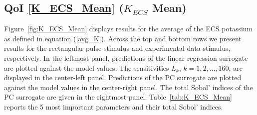 

\subsection{QoI \eqref{K_ECS_Mean} ($K_{ECS}$ Mean)}
\label{sec:qoi_K_ECS_Mean}

Figure~\ref{fig:K_ECS_Mean} displays results for the average of the ECS potassium as defined in equation (\ref{avg_K}). Across the top and bottom rows we present results for the rectangular pulse stimulus and experimental data stimulus, respectively. In the leftmost panel, predictions of the linear regression surrogate are plotted against the model values. The sensitivities $L_k$, $k=1,2,\dots,160$, are displayed in the center-left panel. Predictions of the PC surrogate are plotted against the model values in the center-right panel. The total Sobol' indices of the PC surrogate are given in the rightmost panel. Table~\ref{tab:K_ECS_Mean} reports the 5 most important parameters and their total Sobol' indices. 

